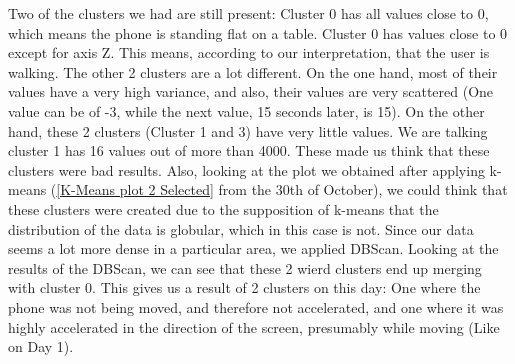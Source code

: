 \documentclass[idxtotoc,hyperref,openany]{labbook} %
\begin{document}
Two of the clusters we had are still present: Cluster 0 has all values close to 0, which means the phone is standing flat on a table. Cluster 0 has values close to 0 except for axis Z. This means, according to our interpretation, that the user is walking. The other 2 clusters are a lot different. On the one hand, most of their values have a very high variance, and also, their values are very scattered (One value can be of -3, while the next value, 15 seconds later, is 15). On the other hand, these 2 clusters (Cluster 1 and 3) have very little values. We are talking cluster 1 has 16 values out of more than 4000. These made us think that these clusters were bad results. Also, looking at the plot we obtained after applying k-means (\ref{K-Means plot 2 Selected} from the 30th of October), we could think that these clusters were created due to the supposition of k-means that the distribution of the data is globular, which in this case is not. Since our data seems a lot more dense in a particular area, we applied DBScan. Looking at the results of the DBScan, we can see that these 2 wierd clusters end up merging with cluster 0. This gives us a result of 2 clusters on this day: One where the phone was not being moved, and therefore not accelerated, and one where it was highly accelerated in the direction of the screen, presumably while moving (Like on Day 1).
\end{document}
